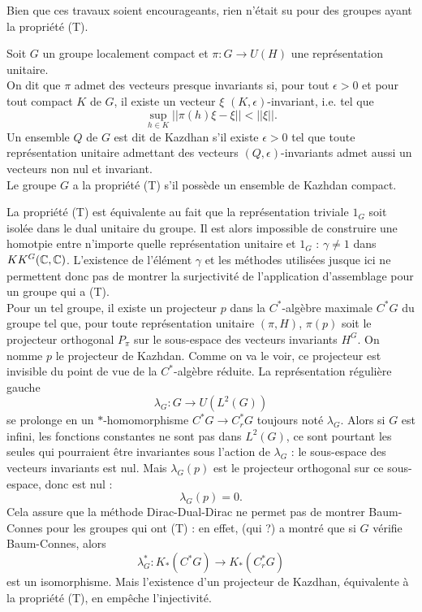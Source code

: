 Bien que ces travaux soient encourageants, rien n'était su pour des groupes ayant la propriété (T).\\

\begin{definition}
Soit $G$ un groupe localement compact et $\pi : G\rightarrow U(H)$ une représentation unitaire. \\
On dit que $\pi$ admet des vecteurs presque invariants si, pour tout $\epsilon>0$ et pour tout compact $K$ de $G$, il existe un vecteur $\xi$ $(K,\epsilon)$-invariant, i.e. tel que 
\[\sup_{h\in K}||\pi(h)\xi - \xi||<||\xi||.\]
Un ensemble $Q$ de $G$ est dit de Kazdhan s'il existe $\epsilon>0$ tel que toute représentation unitaire admettant des vecteurs $(Q,\epsilon)$-invariants admet aussi un vecteurs non nul et invariant. \\
Le groupe $G$ a la propriété (T) s'il possède un ensemble de Kazhdan compact.\\
\end{definition}

La propriété (T) est équivalente au fait que la représentation triviale $1_G$ soit isolée dans le dual unitaire du groupe. Il est alors impossible de construire une homotpie entre n'importe quelle représentation unitaire et $1_G$ : $\gamma \neq 1$ dans $KK^G(\mathbb C,\mathbb C)$. L'existence de l'élément $\gamma$ et les méthodes utilisées jusque ici ne permettent donc pas de montrer la surjectivité de l'application d'assemblage pour un groupe qui a (T).\\

Pour un tel groupe, il existe un projecteur $p$ dans la $C^*$-algèbre maximale $C^*G$ du groupe tel que, pour toute représentation unitaire $(\pi,H)$, $\pi(p)$ soit le projecteur orthogonal $P_\pi$ sur le sous-espace des vecteurs invariants $H^G$. On nomme $p$ le projecteur de Kazhdan. Comme on va le voir, ce projecteur est invisible du point de vue de la $C^*$-algèbre réduite. La représentation régulière gauche
\[\lambda_G : G\rightarrow U(L^2(G))\]
se prolonge en un $*$-homomorphisme $C^*G\rightarrow C^*_r G$ toujours noté $\lambda_G$. Alors si $G$ est infini, les fonctions constantes ne sont pas dans $L^2(G)$, ce sont pourtant les seules qui pourraient être invariantes sous l'action de $\lambda_G$ : le sous-espace des vecteurs invariants est nul. Mais $\lambda_G(p)$ est le projecteur orthogonal sur ce sous-espace, donc est nul :
\[\lambda_G(p)=0.\]
Cela assure que la méthode Dirac-Dual-Dirac ne permet pas de montrer Baum-Connes pour les groupes qui ont (T) : en effet, (qui ?) a montré que si $G$ vérifie Baum-Connes, alors 
\[\lambda_G^*: K_*(C^* G)\rightarrow K_*(C^*_r G)\]
est un isomorphisme. Mais l'existence d'un projecteur de Kazdhan, équivalente à la propriété (T), en empêche l'injectivité.\\

